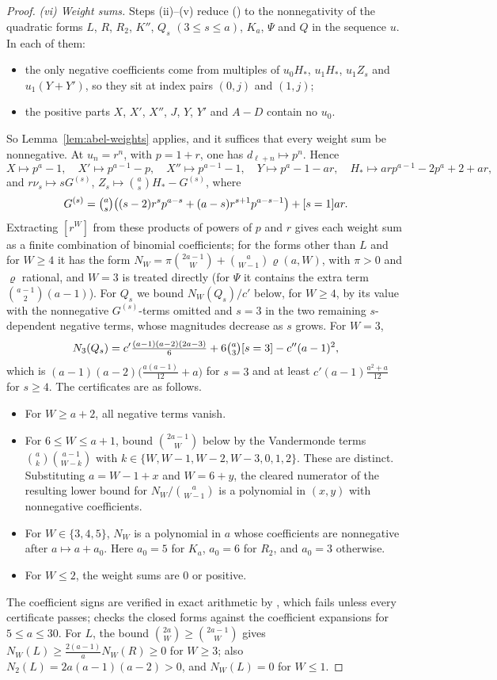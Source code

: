 \documentclass[twoside,10pt]{article}
\numberwithin{equation}{section}
\theoremstyle{slbody}
\theoremstyle{definition}
\theoremstyle{remark}
\renewcommand{\eqref}[1]{\textup{{\normalfont(\oldstylenums{\ref{#1}}}\normalfont)}}
\begin{document}
\begin{proof}
\emph{(vi) Weight sums.} Steps (ii)--(v) reduce \eqref{eq:G-key} to the nonnegativity of the quadratic forms $L$, $R$, $R_2$, $K''$, $Q_s$ $(3\leq s\leq a)$, $K_a$, $\Psi$ and $\widehat Q$ in the sequence $u$. In each of them:
\begin{itemize}
\item the only negative coefficients come from multiples of $u_0H_*$, $u_1H_*$, $u_1Z_s$ and $u_1(Y+Y')$, so they sit at index pairs $(0,j)$ and $(1,j)$;
\item the positive parts $X$, $X'$, $X''$, $J$, $Y$, $Y'$ and $A-D$ contain no $u_0$.
\end{itemize}
So Lemma~\ref{lem:abel-weights} applies, and it suffices that every weight sum be nonnegative. At $u_n=r^n$, with $p=1+r$, one has $d_{\ell+n}\mapsto p^n$. Hence
\[
X\mapsto p^a-1,\quad X'\mapsto p^{a-1}-p,\quad X''\mapsto p^{a-1}-1,\quad Y\mapsto p^a-1-ar,\quad H_*\mapsto arp^{a-1}-2p^a+2+ar,
\]
and $r\nu_s\mapsto sG^{(s)}$, $Z_s\mapsto\binom asH_*-G^{(s)}$, where
\[
G^{(s)}=\tbinom as\bigl((s-2)r^sp^{a-s}+(a-s)r^{s+1}p^{a-s-1}\bigr)+[s=1]ar.
\]
Extracting $[r^W]$ from these products of powers of $p$ and $r$ gives each weight sum as a finite combination of binomial coefficients; for the forms other than $L$ and for $W\geq4$ it has the form $N_W=\pi\binom{2a-1}W+\binom a{W-1}\varrho(a,W)$, with $\pi>0$ and $\varrho$ rational, and $W=3$ is treated directly (for $\Psi$ it contains the extra term $\binom{a-1}2(a-1)$). For $Q_s$ we bound $N_W(Q_s)/c'$ below, for $W\geq4$, by its value with the nonnegative $G^{(s)}$-terms omitted and $s=3$ in the two remaining $s$-dependent negative terms, whose magnitudes decrease as $s$ grows. For $W=3$,
\[
N_3(Q_s)=c'\tfrac{(a-1)(a-2)(2a-3)}6+6\tbinom a3[s=3]-c''(a-1)^2,
\]
which is $(a-1)(a-2)\bigl(\frac{a(a-1)}{12}+a\bigr)$ for $s=3$ and at least $c'(a-1)\frac{a^2+a}{12}$ for $s\geq4$. The certificates are as follows.
\begin{itemize}
\item For $W\geq a+2$, all negative terms vanish.
\item For $6\leq W\leq a+1$, bound $\binom{2a-1}W$ below by the Vandermonde terms $\binom ak\binom{a-1}{W-k}$ with $k\in\{W,W-1,W-2,W-3,0,1,2\}$. These are distinct. Substituting $a=W-1+x$ and $W=6+y$, the cleared numerator of the resulting lower bound for $N_W/\binom a{W-1}$ is a polynomial in $(x,y)$ with nonnegative coefficients.
\item For $W\in\{3,4,5\}$, $N_W$ is a polynomial in $a$ whose coefficients are nonnegative after $a\mapsto a+a_0$. Here $a_0=5$ for $K_a$, $a_0=6$ for $R_2$, and $a_0=3$ otherwise.
\item For $W\leq2$, the weight sums are $0$ or positive.
\end{itemize}
The coefficient signs are verified in exact arithmetic by , which fails unless every certificate passes;  checks the closed forms against the coefficient expansions for $5\leq a\leq30$. For $L$, the bound $\binom{2a}W\geq\binom{2a-1}W$ gives $N_W(L)\geq\frac{2(a-1)}aN_W(R)\geq0$ for $W\geq3$; also $N_2(L)=2a(a-1)(a-2)>0$, and $N_W(L)=0$ for $W\leq1$.


\end{proof}
\end{document}
